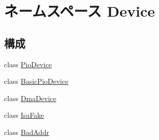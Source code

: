 \hypertarget{namespaceDevice}{
\section{ネームスペース Device}
\label{namespaceDevice}
}
\subsection*{構成}
\begin{DoxyCompactItemize}
\item 
class \hyperlink{classDevice_1_1PioDevice}{PioDevice}
\item 
class \hyperlink{classDevice_1_1BasicPioDevice}{BasicPioDevice}
\item 
class \hyperlink{classDevice_1_1DmaDevice}{DmaDevice}
\item 
class \hyperlink{classDevice_1_1IsaFake}{IsaFake}
\item 
class \hyperlink{classDevice_1_1BadAddr}{BadAddr}
\end{DoxyCompactItemize}
